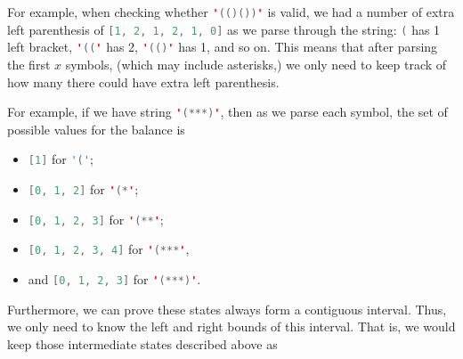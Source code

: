 For example, when checking whether \lstinline[language=Java, basicstyle=\small\ttfamily, keywordstyle=\bfseries\color{green!40!black}]|'(()())'| is valid, we had a number of extra left parenthesis of \lstinline[language=Java, basicstyle=\small\ttfamily, keywordstyle=\bfseries\color{green!40!black}]|[1, 2, 1, 2, 1, 0]| as we parse through the string: \lstinline[language=Java, basicstyle=\small\ttfamily, keywordstyle=\bfseries\color{green!40!black}]|(| has 1 left bracket, \lstinline[language=Java, basicstyle=\small\ttfamily, keywordstyle=\bfseries\color{green!40!black}]|'(('| has 2, \lstinline[language=Java, basicstyle=\small\ttfamily, keywordstyle=\bfseries\color{green!40!black}]|'(()'| has 1, and so on. This means that after parsing the first $x$ symbols, (which may include asterisks,) we only need to keep track of how many there could have extra left parenthesis.

For example, if we have string \lstinline[language=Java, basicstyle=\small\ttfamily, keywordstyle=\bfseries\color{green!40!black}]|'(***)'|, then as we parse each symbol, the set of possible values for the balance is
\begin{itemize}
\item \lstinline[language=Java, basicstyle=\small\ttfamily, keywordstyle=\bfseries\color{green!40!black}]|[1]| for \lstinline[language=Java, basicstyle=\small\ttfamily, keywordstyle=\bfseries\color{green!40!black}]|'('|;
\item \lstinline[language=Java, basicstyle=\small\ttfamily, keywordstyle=\bfseries\color{green!40!black}]|[0, 1, 2]| for \lstinline[language=Java, basicstyle=\small\ttfamily, keywordstyle=\bfseries\color{green!40!black}]|'(*'|;
\item \lstinline[language=Java, basicstyle=\small\ttfamily, keywordstyle=\bfseries\color{green!40!black}]|[0, 1, 2, 3]| for \lstinline[language=Java, basicstyle=\small\ttfamily, keywordstyle=\bfseries\color{green!40!black}]|'(**'|;
\item \lstinline[language=Java, basicstyle=\small\ttfamily, keywordstyle=\bfseries\color{green!40!black}]|[0, 1, 2, 3, 4]| for \lstinline[language=Java, basicstyle=\small\ttfamily, keywordstyle=\bfseries\color{green!40!black}]|'(***'|, 
\item and \lstinline[language=Java, basicstyle=\small\ttfamily, keywordstyle=\bfseries\color{green!40!black}]|[0, 1, 2, 3]| for \lstinline[language=Java, basicstyle=\small\ttfamily, keywordstyle=\bfseries\color{green!40!black}]|'(***)'|.

\end{itemize}
Furthermore, we can prove these states always form a contiguous interval. Thus, we only need to know the left and right bounds of this interval. That is, we would keep those intermediate states described above as 

